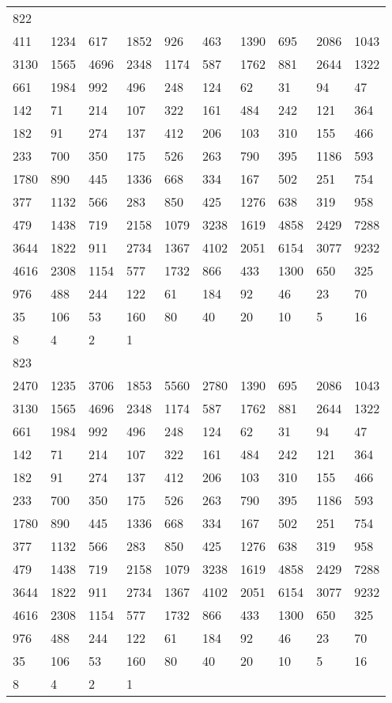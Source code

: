\begin{longtable}{*{10}{l}}
822&&&&&&&&&\\
411& 1234& 617& 1852& 926& 463& 1390& 695& 2086& 1043\\
3130& 1565& 4696& 2348& 1174& 587& 1762& 881& 2644& 1322\\
661& 1984& 992& 496& 248& 124& 62& 31& 94& 47\\
142& 71& 214& 107& 322& 161& 484& 242& 121& 364\\
182& 91& 274& 137& 412& 206& 103& 310& 155& 466\\
233& 700& 350& 175& 526& 263& 790& 395& 1186& 593\\
1780& 890& 445& 1336& 668& 334& 167& 502& 251& 754\\
377& 1132& 566& 283& 850& 425& 1276& 638& 319& 958\\
479& 1438& 719& 2158& 1079& 3238& 1619& 4858& 2429& 7288\\
3644& 1822& 911& 2734& 1367& 4102& 2051& 6154& 3077& 9232\\
4616& 2308& 1154& 577& 1732& 866& 433& 1300& 650& 325\\
976& 488& 244& 122& 61& 184& 92& 46& 23& 70\\
35& 106& 53& 160& 80& 40& 20& 10& 5& 16\\
8& 4& 2& 1& \\

823&&&&&&&&&\\
2470& 1235& 3706& 1853& 5560& 2780& 1390& 695& 2086& 1043\\
3130& 1565& 4696& 2348& 1174& 587& 1762& 881& 2644& 1322\\
661& 1984& 992& 496& 248& 124& 62& 31& 94& 47\\
142& 71& 214& 107& 322& 161& 484& 242& 121& 364\\
182& 91& 274& 137& 412& 206& 103& 310& 155& 466\\
233& 700& 350& 175& 526& 263& 790& 395& 1186& 593\\
1780& 890& 445& 1336& 668& 334& 167& 502& 251& 754\\
377& 1132& 566& 283& 850& 425& 1276& 638& 319& 958\\
479& 1438& 719& 2158& 1079& 3238& 1619& 4858& 2429& 7288\\
3644& 1822& 911& 2734& 1367& 4102& 2051& 6154& 3077& 9232\\
4616& 2308& 1154& 577& 1732& 866& 433& 1300& 650& 325\\
976& 488& 244& 122& 61& 184& 92& 46& 23& 70\\
35& 106& 53& 160& 80& 40& 20& 10& 5& 16\\
8& 4& 2& 1& \\


\end{longtable}
